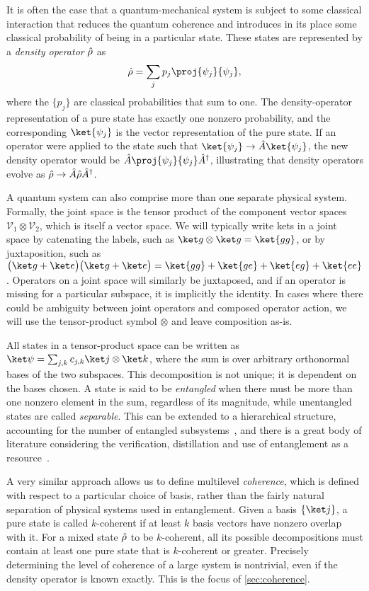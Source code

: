 It is often the case that a quantum-mechanical system is subject to some classical interaction that reduces the quantum coherence and introduces in its place some classical probability of being in a particular state.
These states are represented by a \emph{density operator} $\hat{\rho}$ as
\begin{equation}
\op\rho = \sum_j p_j \proj{\psi_j}{\psi_j},
\end{equation}
where the $\{p_j\}$ are classical probabilities that sum to one.
The density-operator representation of a pure state has exactly one nonzero probability, and the corresponding $\ket{\psi_j}$ is the vector representation of the pure state.
If an operator were applied to the state such that $\ket{\psi_j}\to\op A\ket{\psi_j}$, the new density operator would be $\op A\proj{\psi_j}{\psi_j}\op A^\dagger$, illustrating that density operators evolve as $\hat{\rho}\to\hat{A}\hat{\rho}\hat{A}^\dagger$.

A quantum system can also comprise more than one separate physical system.
Formally, the joint space is the tensor product of the component vector spaces $\mathcal V_1 \otimes \mathcal V_2$, which is itself a vector space.
We will typically write kets in a joint space by catenating the labels, such as $\ket g\otimes\ket g = \ket{gg}$, or by juxtaposition, such as $\bigl(\ket g + \ket e\bigr)\bigl(\ket g + \ket e\bigr) = \ket{gg} + \ket{ge} + \ket{eg} + \ket{ee}$.
Operators on a joint space will similarly be juxtaposed, and if an operator is missing for a particular subspace, it is implicitly the identity.
In cases where there could be ambiguity between joint operators and composed operator action, we will use the tensor-product symbol $\otimes$ and leave composition as-is.

All states in a tensor-product space can be written as $\ket\psi = \sum_{j,k} c_{j,k} \ket j\otimes\ket k$, where the sum is over arbitrary orthonormal bases of the two subspaces.
This decomposition is not unique; it is dependent on the bases chosen.
A state is said to be \emph{entangled} when there must be more than one nonzero element in the sum, regardless of its magnitude, while unentangled states are called \emph{separable}.
This can be extended to a hierarchical structure, accounting for the number of entangled subsystems~\cite{Szalay2015}, and there is a great body of literature considering the verification, distillation and use of entanglement as a resource~\cite{Horodecki2009,Chitambar2019,Dur2007}.

A very similar approach allows us to define multilevel \emph{coherence}, which is defined with respect to a particular choice of basis, rather than the fairly natural separation of physical systems used in entanglement.
Given a basis $\{\ket j\}$, a pure state is called $k$-coherent if at least $k$ basis vectors have nonzero overlap with it.
For a mixed state $\hat{\rho}$ to be $k$-coherent, all its possible decompositions must contain at least one pure state that is $k$-coherent or greater.
Precisely determining the level of coherence of a large system is nontrivial, even if the density operator is known exactly.
This is the focus of \cref{sec:coherence}.


